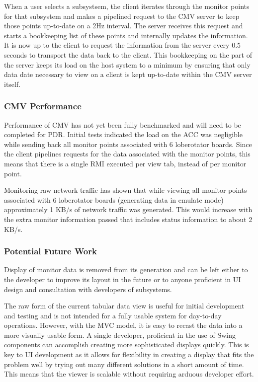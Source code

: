 \documentclass[preprint]{aastex}
\begin{document}
When a user selects a subsystsem, the client iterates through the monitor
points for that subsystem and makes a pipelined request to the CMV server
to keep those points up-to-date on a 2Hz interval.  The server receives this
request and starts a bookkeeping list of these points and internally updates
the information.  It is now up to the client to request the information
from the server every 0.5 seconds to transport the data back to the client.
This bookkeeping on the part of the server keeps its load on the host
system to a minimum by ensuring that only data date necessary to
view on a client is kept up-to-date within the CMV server itself.

\subsubsection{CMV Performance}

Performance of CMV has not yet been fully benchmarked and will need
to be completed for PDR.  Initial tests indicated the load on the ACC
was negligible while sending back all monitor points associated with 6
loberotator boards.  Since the client pipelines requests for the data
associated with the monitor points, this means that there is a single
RMI executed per view tab, instead of per monitor point.

Monitoring raw network traffic has shown that while viewing all monitor
points associated with 6 loberotator boards (generating data in emulate
mode) approximately 1 KB/s of network traffic was generated.  This would
increase with the extra monitor information passed that includes status
information to about 2 KB/s.

\subsubsection{Potential Future Work}
Display of monitor data is removed from its generation and
can be left either to the developer to improve its layout in the 
future or to anyone proficient in UI design and consultation with
developers of subsystems.

The raw form of the current tabular data view is useful for initial
development and testing and is not intended for a fully usable system
for day-to-day operations.  However, with the MVC model, it is easy to
recast the data into a more visually usable form.  A single developer,
proficient in the use of Swing components can accomplish creating more
sophisticated displays quickly.  This is key to UI development as it allows
for flexibility in creating a display that fits the problem well by trying
out many different solutions in a short amount of time.  This means that
the viewer is scalable without requiring arduous developer effort.
\end{document}
